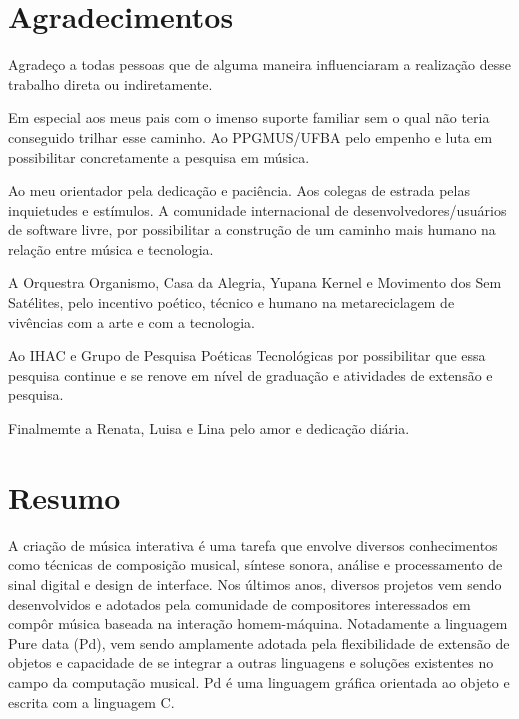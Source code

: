 \documentclass[draft]{ppgmus}
\begin{document}
 
\frontmatter
\maketitle

\chapter*{Agradecimentos}
\label{cha:agradecimentos}

Agradeço a todas pessoas que de alguma maneira
influenciaram a realização desse trabalho direta ou indiretamente.

Em especial aos meus pais com o imenso suporte familiar sem o qual
não teria conseguido trilhar esse caminho. Ao PPGMUS/UFBA
pelo empenho e luta em possibilitar concretamente a pesquisa em música.

Ao meu orientador pela dedicação e paciência. Aos colegas de estrada
pelas inquietudes e estímulos. A comunidade internacional de desenvolvedores/usuários
de software livre, por possibilitar a construção de um caminho mais humano
na relação entre música e tecnologia.

A Orquestra Organismo, Casa da Alegria, Yupana Kernel e Movimento dos Sem Satélites,
pelo incentivo poético, técnico e humano na metareciclagem de vivências
com a arte e com a tecnologia.

Ao IHAC e Grupo de Pesquisa Poéticas Tecnológicas por possibilitar
que essa pesquisa continue e se renove em nível de graduação e atividades de
extensão e pesquisa.

Finalmemte a Renata, Luisa e Lina pelo amor e dedicação diária.

\chapter*{Resumo}
\label{cha:resumo}

A criação de música interativa é uma tarefa que envolve diversos 
conhecimentos como técnicas de composição musical, síntese sonora,
análise e processamento de sinal digital e design de interface.
Nos últimos anos, diversos projetos vem sendo desenvolvidos e adotados
pela comunidade de compositores interessados em compôr música baseada
na interação homem-máquina. Notadamente a linguagem Pure data (Pd),
vem sendo amplamente adotada pela flexibilidade de extensão de objetos 
e capacidade de se integrar a outras linguagens e soluções existentes
no campo da computação musical. Pd é uma linguagem gráfica orientada
ao objeto e escrita com a linguagem C.
\end{document}
